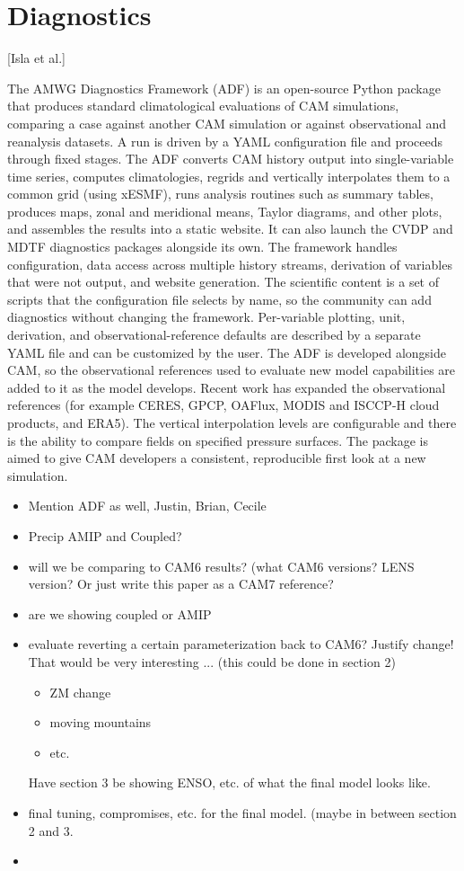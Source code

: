 \documentclass[draft]{agujournal2019}
\begin{document}
 
 \section{Diagnostics}
 [Isla et al.]
 
The AMWG Diagnostics Framework (ADF) is an open-source Python package that produces standard climatological evaluations of CAM simulations, comparing a case against another CAM simulation or against observational and reanalysis datasets. A run is driven by a YAML configuration file and proceeds through fixed stages. The ADF converts CAM history output into single-variable time series, computes climatologies, regrids and vertically interpolates them to a common grid (using xESMF), runs analysis routines such as summary tables, produces maps, zonal and meridional means, Taylor diagrams, and other plots, and assembles the results into a static website. It can also launch the CVDP and MDTF diagnostics packages alongside its own. The framework handles configuration, data access across multiple history streams, derivation of variables that were not output, and website generation. The scientific content is a set of scripts that the configuration file selects by name, so the community can add diagnostics without changing the framework. Per-variable plotting, unit, derivation, and observational-reference defaults are described by a separate YAML file and can be customized by the user. The ADF is developed alongside CAM, so the observational references used to evaluate new model capabilities are added to it as the model develops. Recent work has expanded the observational references (for example CERES, GPCP, OAFlux, MODIS and ISCCP-H cloud products, and ERA5). The vertical interpolation levels are configurable and there is the ability to compare fields on specified pressure surfaces. The package is aimed to give CAM developers a consistent, reproducible first look at a new simulation.

 \begin{itemize}
 \item Mention ADF as well, Justin, Brian, Cecile
 \item Precip AMIP and Coupled?
 \item will we be comparing to CAM6 results? (what CAM6 versions? LENS version? Or just write this paper as a CAM7 reference?
 \item are we showing coupled or AMIP
 \item evaluate reverting a certain parameterization back to CAM6? Justify change! That would be very interesting ... (this could be done in section 2)
 \begin{itemize}
     \item ZM change
     \item moving mountains
     \item etc.
 \end{itemize}
 Have section 3 be showing ENSO, etc. of what the final model looks like.
 \item final tuning, compromises, etc. for the final model. (maybe in between section 2 and 3.
 \item 
 \end{itemize}
\end{document}

